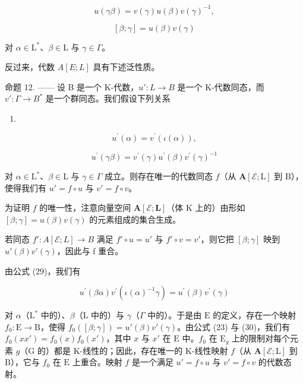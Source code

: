\[
u (\gamma \beta) = v (\gamma) u (\beta) v (\gamma) ^ {- 1},\tag{28}
\]

\[
[ \beta ; \gamma ] = u (\beta) v (\gamma)
\]

对 \(\alpha \in \mathrm{L}^*\)、\(\beta \in \mathrm{L}\) 与 \(\gamma \in \Gamma\)。

反过来，代数 \(A[E;L]\) 具有下述泛性质。

命题 12. —— 设 B 是一个 K-代数，\(u' : L \to B\) 是一个 K-代数同态，而 \(v' : \Gamma \to B^{*}\) 是一个群同态。我们假设下列关系

\begin{enumerate}
\def\labelenumi{(\arabic{enumi})}
\setcounter{enumi}{28}
\tightlist
\item
\end{enumerate}

\[
u ^ {\prime} (\alpha) = v ^ {\prime} (\iota (\alpha)),\tag{30}
\]

\[
u ^ {\prime} (\gamma \beta) = v ^ {\prime} (\gamma) u ^ {\prime} (\beta) v ^ {\prime} (\gamma) ^ {- 1}
\]

对 \(\alpha \in \mathrm{L}^*\)、\(\beta \in \mathrm{L}\) 与 \(\gamma \in \Gamma\) 成立。则存在唯一的代数同态 \(f\)（从 \(\mathbf{A}[\mathcal{E};\mathrm{L}]\) 到 \(\mathrm{B}\)），使得我们有 \(u' = f \circ u\) 与 \(v' = f \circ v\)。

为证明 \(f\) 的唯一性，注意向量空间 \(\mathbf{A}[\mathcal{E};\mathbf{L}]\)（体 \(\mathrm{K}\) 上的）由形如 \([\beta ;\gamma ] = u(\beta)v(\gamma)\) 的元素组成的集合生成。

若同态 \(f' : A[\mathcal{E}; L] \to B\) 满足 \(f' \circ u = u'\) 与 \(f' \circ v = v'\)，则它把 \([\beta; \gamma]\) 映到 \(u'(\beta)v'(\gamma)\)，因此与 f 重合。

由公式 (29)，我们有

\[
u ^ {\prime} (\beta \alpha) v ^ {\prime} (\iota (\alpha) ^ {- 1} \gamma) = u ^ {\prime} (\beta) v ^ {\prime} (\gamma)\tag{31}
\]

对 \(\alpha\)（\(\mathrm{L}^*\) 中的）、\(\beta\)（\(\mathrm{L}\) 中的）与 \(\gamma\)（\(\Gamma\) 中的）。于是由 \(\mathrm{E}\) 的定义，存在一个映射 \(f_0: \mathrm{E} \to \mathrm{B}\)，使得 \(f_0([\beta; \gamma]) = u'(\beta)v'(\gamma)\)。由公式 (23) 与 (30)，我们有 \(f_0(xx') = f_0(x)f_0(x')\)，其中 \(x\) 与 \(x'\) 在 \(\mathrm{E}\) 中。\(f_0\) 在 \(\mathrm{E}_g\) 上的限制对每个元素 \(g\)（\(\mathrm{G}\) 的）都是 K-线性的；因此，存在唯一的 K-线性映射 \(f\)（从 \(\mathbf{A}[\mathcal{E}; \mathrm{L}]\) 到 \(\mathrm{B}\)），它与 \(f_0\) 在 \(\mathrm{E}\) 上重合。映射 \(f\) 是一个满足 \(u' = f \circ u\) 与 \(v' = f \circ v\) 的代数态射。

